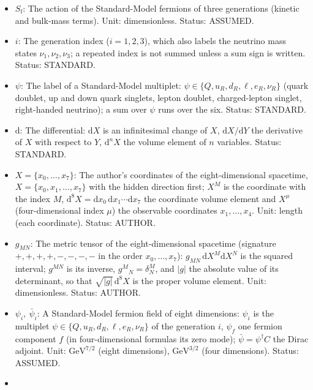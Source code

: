 \documentclass[
  10pt,
]{article}
\providecommand{\tightlist}{%
  \setlength{\itemsep}{0pt}\setlength{\parskip}{0pt}}
\begin{document}
\begin{itemize}
\tightlist
\item
  \(S_{\mathrm{f}}\): The action of the Standard-Model fermions of three
  generations (kinetic and bulk-mass terms). Unit: dimensionless.
  Status: ASSUMED.
\item
  \(i\): The generation index (\(i = 1, 2, 3\)), which also labels the
  neutrino mass states \(\nu_1, \nu_2, \nu_3\); a repeated index is not
  summed unless a sum sign is written. Status: STANDARD.
\item
  \(\psi\): The label of a Standard-Model multiplet:
  \(\psi \in \{Q, u_R, d_R, \ell, e_R, \nu_R\}\) (quark doublet, up and
  down quark singlets, lepton doublet, charged-lepton singlet,
  right-handed neutrino); a sum over \(\psi\) runs over the six. Status:
  STANDARD.
\item
  \(\mathrm{d}\): The differential: \(\mathrm{d}X\) is an infinitesimal
  change of \(X\), \(\mathrm{d}X/\mathrm{d}Y\) the derivative of \(X\)
  with respect to \(Y\), \(\mathrm{d}^nX\) the volume element of \(n\)
  variables. Status: STANDARD.
\item
  \(X = \{x_0, \dots, x_7\}\): The author's coordinates of the
  eight-dimensional spacetime, \(X = \{x_0, x_1, \dots, x_7\}\) with the
  hidden direction first; \(X^M\) is the coordinate with the index
  \(M\),
  \(\mathrm{d}^8X = \mathrm{d}x_0\,\mathrm{d}x_1\cdots\mathrm{d}x_7\)
  the coordinate volume element and \(X^\mu\) (four-dimensional index
  \(\mu\)) the observable coordinates \(x_1, \dots, x_4\). Unit: length
  (each coordinate). Status: AUTHOR.
\item
  \(g_{MN}\): The metric tensor of the eight-dimensional spacetime
  (signature \(+,+,+,+,-,-,-,-\) in the order \(x_0, \dots, x_7\)):
  \(g_{MN}\,\mathrm{d}X^M\mathrm{d}X^N\) is the squared interval;
  \(g^{MN}\) is its inverse, \(g^M{}_N = \delta^M_N\), and
  \(\lvert g\rvert\) the absolute value of its determinant, so that
  \(\sqrt{\lvert g\rvert}\,\mathrm{d}^8X\) is the proper volume element.
  Unit: dimensionless. Status: AUTHOR.
\item
  \(\psi_i,\ \bar\psi_i\): A Standard-Model fermion field of eight
  dimensions: \(\psi_i\) is the multiplet
  \(\psi \in \{Q, u_R, d_R, \ell, e_R, \nu_R\}\) of the generation
  \(i\), \(\psi_f\) one fermion component \(f\) (in four-dimensional
  formulas its zero mode); \(\bar\psi = \psi^\dagger C\) the Dirac
  adjoint. Unit: \(\mathrm{GeV}^{7/2}\) (eight dimensions),
  \(\mathrm{GeV}^{3/2}\) (four dimensions). Status: ASSUMED.
\item

\end{itemize}
\end{document}
